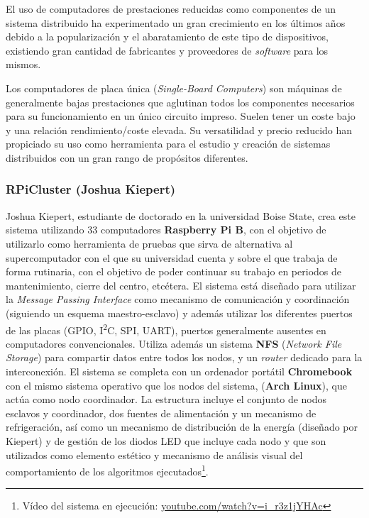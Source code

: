 El uso de computadores de prestaciones reducidas como componentes de un sistema distribuido ha experimentado un gran crecimiento en los últimos años debido a la popularización y el abaratamiento de este tipo de dispositivos, existiendo gran cantidad de fabricantes y proveedores de \textit{software} para los mismos.

Los computadores de placa única (\textit{Single-Board Computers}) son máquinas de generalmente bajas prestaciones que aglutinan todos los componentes necesarios para su funcionamiento en un único circuito impreso. Suelen tener un coste bajo y una relación rendimiento/coste elevada. Su versatilidad y precio reducido han propiciado su uso como herramienta para el estudio y creación de sistemas distribuidos con un gran rango de propósitos diferentes.

\subsubsection{RPiCluster (Joshua Kiepert)}

Joshua Kiepert, estudiante de doctorado en la universidad Boise State, crea este sistema utilizando 33 computadores \textbf{Raspberry Pi B}, con el objetivo de utilizarlo como herramienta de pruebas que sirva de alternativa al supercomputador con el que su universidad cuenta\cite{joshuarpicluster} y sobre el que trabaja de forma rutinaria, con el objetivo de poder continuar su trabajo en periodos de mantenimiento, cierre del centro, etcétera. El sistema está diseñado para utilizar la \textit{Message Passing Interface} como mecanismo de comunicación y coordinación (siguiendo un esquema maestro-esclavo) y además utilizar los diferentes puertos de las placas (GPIO, I\textsuperscript{2}C, SPI, UART), puertos generalmente ausentes en computadores convencionales. Utiliza además un sistema \textbf{NFS} (\textit{Network File Storage}) para compartir datos entre todos los nodos, y un \textit{router} dedicado para la interconexión. El sistema se completa con un ordenador portátil \textbf{Chromebook} con el mismo sistema operativo que los nodos del sistema, (\textbf{Arch Linux}), que actúa como nodo coordinador. La estructura incluye el conjunto de nodos esclavos y coordinador, dos fuentes de alimentación y un mecanismo de refrigeración, así como un mecanismo de distribución de la energía (diseñado por Kiepert) y de gestión de los diodos LED que incluye cada nodo y que son utilizados como elemento estético y mecanismo de análisis visual del comportamiento de los algoritmos ejecutados\footnote{Vídeo del sistema en ejecución: \href{https://www.youtube.com/watch?v=i_r3z1jYHAc}{youtube.com/watch?v=i\_r3z1jYHAc}}.

